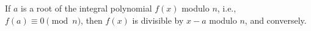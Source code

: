 If $a$ is a root of the integral polynomial $f(x)$ modulo $n$, i.e., $f(a) \equiv 0 \pmod{n}$, then $f(x)$ is divisible by $x - a$ modulo $n$, and conversely.
